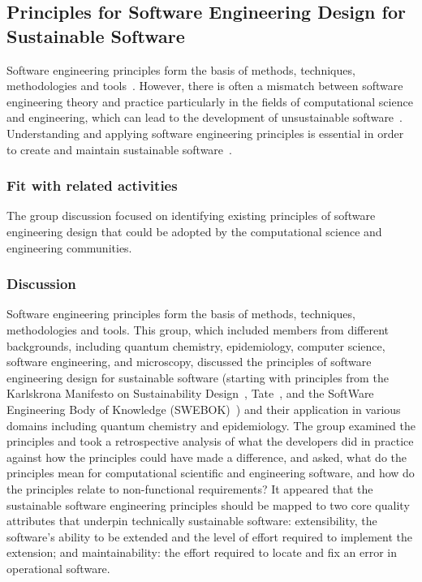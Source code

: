 \subsection{Principles for Software Engineering Design for Sustainable Software} 


Software engineering principles form the basis of methods, techniques, methodologies and tools~\cite{Vliet:2008}. However, there is often a mismatch between software engineering theory and practice particularly in the fields of computational science and engineering, which can lead to the development of unsustainable software~\cite{Merali:2010,hettrick:2014}. Understanding and applying software engineering principles is essential in order to create and maintain sustainable software~\cite{Becker:2016}.

\subsubsection{Fit with related activities}
The group discussion focused on identifying existing principles of software engineering design that could be adopted by the computational science and engineering communities.

\subsubsection{Discussion}

Software engineering principles form the basis of methods, techniques, methodologies and tools. This group, which included members from different backgrounds, including quantum chemistry, epidemiology, computer science, software engineering, and microscopy, discussed the principles of software engineering design for sustainable software (starting with principles from the Karlskrona Manifesto on Sustainability Design~\cite{Becker:2015}, Tate~\cite{tate:2005}, and the SoftWare Engineering Body of Knowledge (SWEBOK)~\cite{swebokv3}) and their application in various domains including quantum chemistry and epidemiology.  The group examined the principles and took a retrospective analysis of what the developers did in practice against how the principles could have made a difference, and asked, what do the principles mean for  computational scientific and engineering software, and how do the principles relate to non-functional requirements? It
appeared that the sustainable software engineering principles should be mapped to two core quality attributes that underpin technically sustainable software: extensibility, the software's ability to be extended and the level of effort required to implement the extension; and
maintainability: the effort required to locate and fix an error in operational software.

